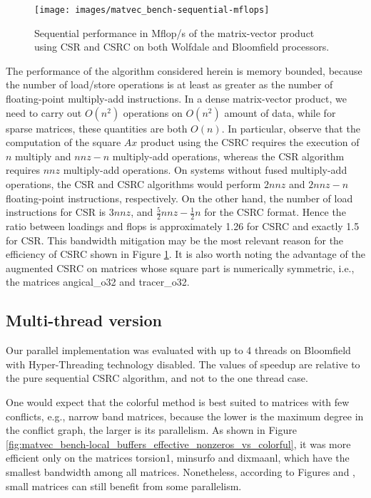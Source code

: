 \documentclass[11pt]{article}
\begin{document}
\begin{figure}[t]
\centering
\texttt{[image: images/matvec\_bench-sequential-mflops]}
\caption{Sequential performance in Mflop/s of the matrix-vector
product using CSR and CSRC on both Wolfdale and Bloomfield processors.}
\label{fig:matvec_bench-sequential-mflops}
\end{figure}

The performance of the algorithm considered herein is memory bounded, because the
number of load/store operations is at least as greater as the number of
floating-point multiply-add instructions.  In a dense matrix-vector product, we
need to carry out $O(n^2)$ operations on $O(n^2)$ amount of data, while for sparse
matrices, these quantities are both $O(n)$.
In particular, observe that the computation
of the square $Ax$ product using the CSRC requires the execution of $n$ multiply and $nnz - n$
multiply-add operations, whereas the CSR algorithm requires $nnz$ multiply-add
operations.  On systems without fused multiply-add operations, the CSR and CSRC
algorithms would perform $2nnz$ and $2nnz - n$ floating-point instructions,
respectively.  On the other hand, the number of load instructions for CSR is
$3nnz$, and $\frac{5}{2}nnz - \frac{1}{2}n$ for the CSRC format. Hence the
ratio between loadings and flops is approximately 1.26 for CSRC and exactly 1.5
for CSR.  This bandwidth mitigation may be the most relevant reason for the
efficiency of CSRC shown in Figure \ref{fig:matvec_bench-sequential-mflops}.
It is also worth noting the advantage of the augmented CSRC on
matrices whose square part is numerically symmetric,
i.e., the matrices angical\_o32 and tracer\_o32.

\subsection{Multi-thread version}

Our parallel implementation was evaluated with up to 4 threads on Bloomfield
with Hyper-Threading technology disabled.
The values of speedup
are relative to the pure sequential CSRC algorithm, and not to the one thread case.

One would expect that the colorful method is best suited to matrices with
few conflicts, e.g., narrow band matrices,
because the lower is the maximum degree in the conflict graph, the larger is its parallelism.
As shown in Figure
\ref{fig:matvec_bench-local_buffers_effective_nonzeros_vs_colorful},
it was more efficient only on the matrices torsion1, minsurfo and dixmaanl, which have the smallest bandwidth among all matrices.
Nonetheless, according to Figures  and , small matrices can still benefit from some parallelism.
\end{document}

